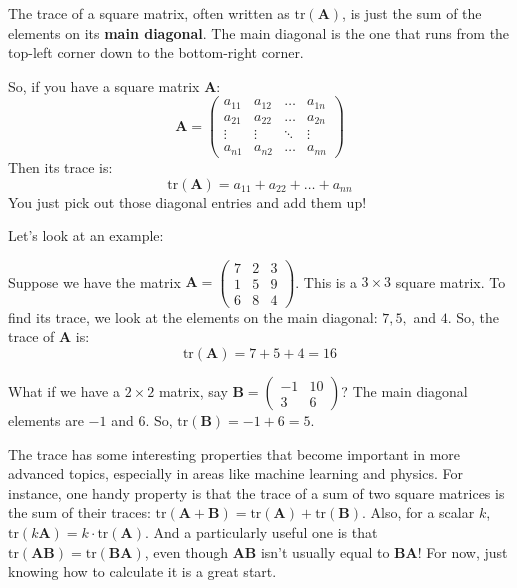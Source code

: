 \documentclass[11pt]{article}
\begin{document}
The trace of a square matrix, often written as $\text{tr}(\mathbf{A})$, is just the sum of the elements on its \textbf{main diagonal}. The main diagonal is the one that runs from the top-left corner down to the bottom-right corner.

So, if you have a square matrix $\mathbf{A}$:
\[ \mathbf{A} = \begin{pmatrix}
a_{11} & a_{12} & \dots & a_{1n} \\
a_{21} & a_{22} & \dots & a_{2n} \\
\vdots & \vdots & \ddots & \vdots \\
a_{n1} & a_{n2} & \dots & a_{nn}
\end{pmatrix} \]
Then its trace is:
\[ \text{tr}(\mathbf{A}) = a_{11} + a_{22} + \dots + a_{nn} \]
You just pick out those diagonal entries and add them up!

Let's look at an example:
\begin{example}
    
\end{example}
Suppose we have the matrix $\mathbf{A} = \begin{pmatrix} 7 & 2 & 3 \\ 1 & 5 & 9 \\ 6 & 8 & 4 \end{pmatrix}$.
This is a $3 \times 3$ square matrix. To find its trace, we look at the elements on the main diagonal: $7, 5,$ and $4$.
So, the trace of $\mathbf{A}$ is:
\[ \text{tr}(\mathbf{A}) = 7 + 5 + 4 = 16 \]

What if we have a $2 \times 2$ matrix, say $\mathbf{B} = \begin{pmatrix} -1 & 10 \\ 3 & 6 \end{pmatrix}$?
The main diagonal elements are $-1$ and $6$.
So, $\text{tr}(\mathbf{B}) = -1 + 6 = 5$.

The trace has some interesting properties that become important in more advanced topics, especially in areas like machine learning and physics. For instance, one handy property is that the trace of a sum of two square matrices is the sum of their traces: $\text{tr}(\mathbf{A} + \mathbf{B}) = \text{tr}(\mathbf{A}) + \text{tr}(\mathbf{B})$. Also, for a scalar $k$, $\text{tr}(k\mathbf{A}) = k \cdot \text{tr}(\mathbf{A})$. And a particularly useful one is that $\text{tr}(\mathbf{A}\mathbf{B}) = \text{tr}(\mathbf{B}\mathbf{A})$, even though $\mathbf{A}\mathbf{B}$ isn't usually equal to $\mathbf{B}\mathbf{A}$! For now, just knowing how to calculate it is a great start.
\end{document}
